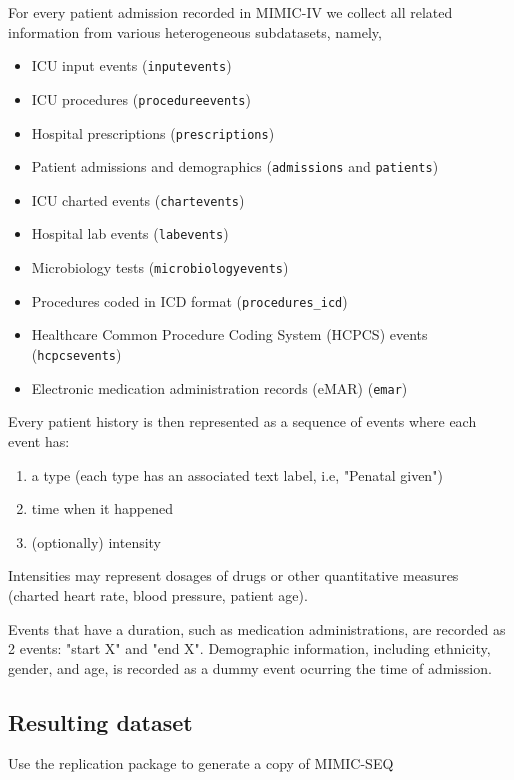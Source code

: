 For every patient admission recorded in MIMIC-IV we collect all related information from various heterogeneous subdatasets, namely,

\begin{itemize}
    \item ICU input events (\texttt{inputevents})
    \item ICU procedures (\texttt{procedureevents})
    \item Hospital prescriptions (\texttt{prescriptions})
    \item Patient admissions and demographics (\texttt{admissions} and \texttt{patients})
    \item ICU charted events (\texttt{chartevents})
    \item Hospital lab events (\texttt{labevents})
    \item Microbiology tests (\texttt{microbiologyevents})
    \item Procedures coded in ICD format (\texttt{procedures\_icd})
    \item Healthcare Common Procedure Coding System (HCPCS) events (\texttt{hcpcsevents})
    \item Electronic medication administration records (eMAR) (\texttt{emar})
\end{itemize}

Every patient history is then represented as a sequence of events where each event has:
\begin{enumerate}
    \item a type (each type has an associated text label, i.e, "Penatal given")
    \item time when it happened
    \item (optionally) intensity
\end{enumerate}

Intensities may represent dosages of drugs or other quantitative measures (charted heart rate, blood pressure, patient age).

Events that have a duration, such as medication administrations, are recorded as 2 events: "start X" and "end X". 
Demographic information, including ethnicity, gender, and age, is recorded as a dummy event ocurring the time of admission.

\subsection{Resulting dataset}

\begin{remark}
    Use the replication package \cite{liventsevVadim0x60Mimicseq2024} to generate a copy of MIMIC-SEQ
\end{remark}

